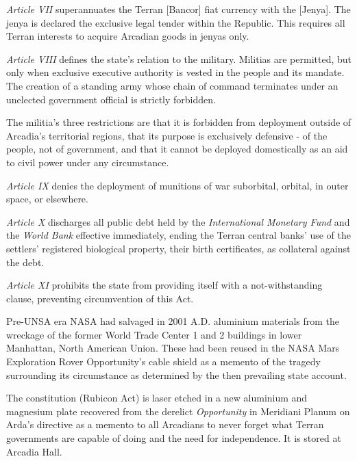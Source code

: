 \item {\it Article VII} superannuates the Terran [Bancor] fiat currency with the [Jenya]. The jenya is declared the exclusive legal tender within the Republic. This requires all Terran interests to acquire Arcadian goods in jenyas only.

\item {\it Article VIII} defines the state's relation to the military. Militias are permitted, but only when exclusive executive authority is vested in the people and its mandate. The creation of a standing army whose chain of command terminates under an unelected government official is strictly forbidden.

The militia's three restrictions are that it is forbidden from deployment outside of Arcadia's territorial regions, that its purpose is exclusively defensive - of the people, not of government, and that it cannot be deployed domestically as an aid to civil power under any circumstance.

\item {\it Article IX} denies the deployment of munitions of war suborbital, orbital, in outer space, or elsewhere.

\item {\it Article X} discharges all public debt held by the {\it International Monetary Fund} and the {\it World Bank} effective immediately, ending the Terran central banks' use of the settlers' registered biological property, their birth certificates, as collateral against the debt.

\item {\it Article XI} prohibits the state from providing itself with a not-withstanding clause, preventing circumvention of this Act.
\stopitemize
\stopTimelineDocument
\crlf

Pre-UNSA era NASA had salvaged in 2001 A.D. aluminium materials from the wreckage of the former World Trade Center 1 and 2 buildings in lower Manhattan, North American Union. These had been reused in the NASA Mars Exploration Rover Opportunity's cable shield as a memento of the tragedy surrounding its circumstance as determined by the then prevailing state account.

The constitution (Rubicon Act) is laser etched in a new aluminium and magnesium plate recovered from the derelict {\it Opportunity} in Meridiani Planum on Arda's directive as a memento to all Arcadians to never forget what Terran governments are capable of doing and the need for independence. It is stored at Arcadia Hall.

